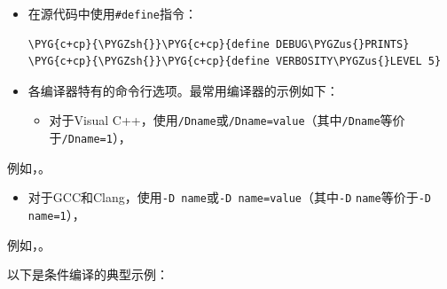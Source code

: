 \begin{itemize}
\item 在源代码中使用\texttt{\#define}指令：



\begin{codeblockbg}
\begin{Verbatim}[commandchars=\\\{\},breaklines=true,breakanywhere=true,fontsize=\codefont,xleftmargin=17bp]
\PYG{c+cp}{\PYGZsh{}}\PYG{c+cp}{define DEBUG\PYGZus{}PRINTS}
\PYG{c+cp}{\PYGZsh{}}\PYG{c+cp}{define VERBOSITY\PYGZus{}LEVEL 5}
\end{Verbatim}
\end{codeblockbg}



\item 各编译器特有的命令行选项。最常用编译器的示例如下：



\begin{itemize}
\item 对于Visual C++，使用\texttt{/\allowbreak{}Dname}或\texttt{/\allowbreak{}Dname=value}（其中\texttt{/\allowbreak{}Dname}等价于\texttt{/\allowbreak{}Dname=1}），

\end{itemize}

\end{itemize}



例如，。



\begin{itemize}
\item 对于GCC和Clang，使用\texttt{-\allowbreak{}D name}或\texttt{-\allowbreak{}D name=value}（其中\texttt{-\allowbreak{}D} \texttt{name}等价于\texttt{-\allowbreak{}D name=1}），

\end{itemize}



例如，。



以下是条件编译的典型示例：



